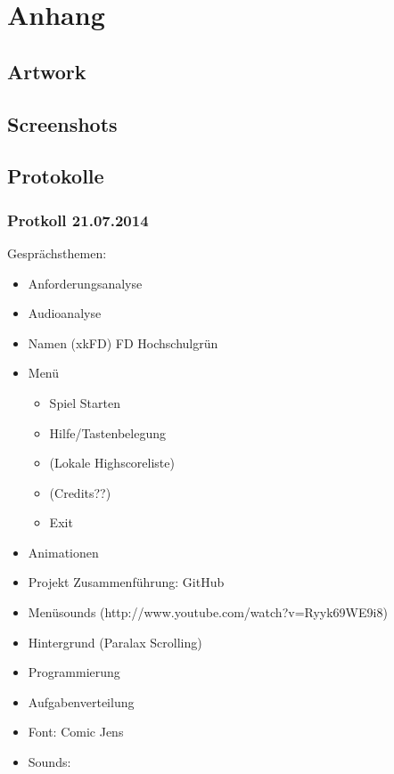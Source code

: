 \documentclass[Skript.tex]{subfiles}
\begin{document}
\newpage
\appendix 
\section{Anhang}

\subsection{Artwork}

\subsection{Screenshots}

\subsection{Protokolle}

\subsubsection*{Protkoll 21.07.2014}

Gesprächsthemen:

\begin{itemize}
\item Anforderungsanalyse
\item Audioanalyse 
\item Namen (xkFD) FD Hochschulgrün
\item Menü
	\begin{itemize}
	\item Spiel Starten
	\item Hilfe/Tastenbelegung
	\item (Lokale Highscoreliste)
	\item (Credits??)
	\item Exit
	\end{itemize}
\item Animationen
\item Projekt Zusammenführung: GitHub
\item Menüsounds (http://www.youtube.com/watch?v=Ryyk69WE9i8)
\item Hintergrund (Paralax Scrolling)
\item Programmierung
\item Aufgabenverteilung
\item Font: Comic Jens
\item Sounds:

\end{itemize}
\end{document}
